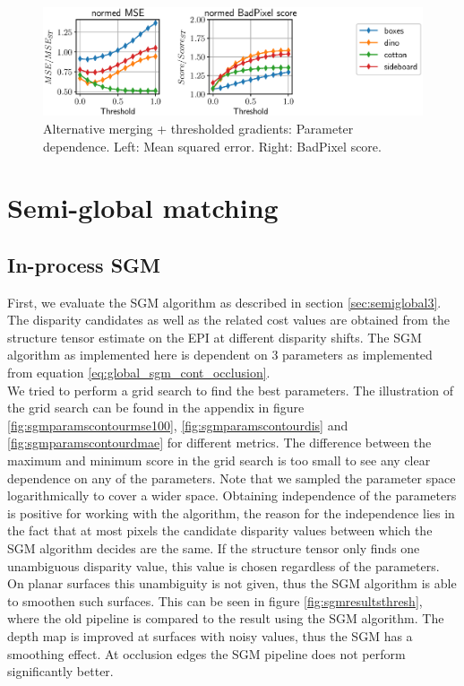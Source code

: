 \documentclass  [
  paper    = a4,
  BCOR     = 10mm,
  twoside,
  fontsize = 12pt,
  fleqn,
  toc      = bibnumbered,
  toc      = listofnumbered,
  numbers  = noendperiod,
  headings = normal,
  listof   = leveldown,
  version  = 3.03
]                                       {scrreprt}
\begin{document}
\begin{figure}[h!]
	\centering
	\includegraphics[width=1\linewidth]{images/choose_lower_params_thresh}
	\caption[Alternative merging: Parameter dependence]{Alternative merging + thresholded gradients: Parameter dependence. Left: Mean squared error. Right: BadPixel score.}
	\label{fig:chooselowerparamsthresh}
\end{figure}
\section{Semi-global matching}
\subsection{In-process SGM}
First, we evaluate the SGM algorithm as described in section \ref{sec:semiglobal3}. The disparity candidates as well as the related cost values are obtained from the structure tensor estimate on the EPI at different disparity shifts.
The SGM algorithm as implemented here is dependent on 3 parameters as implemented  from equation \ref{eq:global_sgm_cont_occlusion}.\\
 We tried to perform a grid search to find the best parameters. The illustration of the grid search can be found in the appendix in figure \ref{fig:sgmparamscontourmse100}, \ref{fig:sgmparamscontourdis} and \ref{fig:sgmparamscontourdmae} for different metrics. The difference between the maximum and minimum score in the grid search is too small to see any clear dependence on any of the parameters. Note that we sampled the parameter space logarithmically to cover a wider space. Obtaining independence of the parameters is positive for working with the algorithm, the reason for the independence lies in the fact that at most pixels the candidate disparity values between which the SGM algorithm decides are the same. If the structure tensor only finds one unambiguous disparity value, this value is chosen regardless of the parameters. On planar surfaces this unambiguity is not given, thus the SGM algorithm is able to smoothen such surfaces. This can be seen in figure \ref{fig:sgmresultsthresh}, where the old pipeline is compared to the result using the SGM algorithm. The depth map is improved at surfaces with noisy values, thus the SGM has a smoothing effect. At occlusion edges the SGM pipeline does not perform significantly better. 
\end{document}
